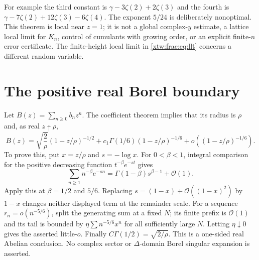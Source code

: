 \documentclass[11pt]{article}
\theoremstyle{remark}\newtheorem{remark}[theorem]{Remark}
\newcommand{\OO}{\mathcal O}
\begin{document}
For example the third constant is $\gamma-3\zeta(2)+2\zeta(3)$ and
the fourth is $\gamma-7\zeta(2)+12\zeta(3)-6\zeta(4)$.
The exponent $5/24$ is deliberately nonoptimal. This theorem is local near
$z=1$; it is not a global complex-$y$ estimate, a lattice local limit for
$K_n$, control of cumulants with growing order, or an explicit finite-$n$
error certificate. The finite-height local limit in \eqref{xtw:frac:eq:llt}
concerns a different random variable.

\section{The positive real Borel boundary}\label{xtw:frac:sec:borel}
Let $B(z)=\sum_{n\ge0}b_nz^n$. The coefficient theorem implies that its
radius is $\rho$ and, as real $z\uparrow\rho$,
\begin{equation}\label{xtw:frac:eq:borel}
 B(z)=\sqrt{\frac2\rho}(1-z/\rho)^{-1/2}
   +c_1\Gamma(1/6)(1-z/\rho)^{-1/6}
   +o((1-z/\rho)^{-1/6}).
\end{equation}
To prove this, put $x=z/\rho$ and $s=-\log x$. For $0<\beta<1$,
integral comparison for the positive decreasing function
$t^{-\beta}e^{-st}$ gives
\[
 \sum_{n\ge1}n^{-\beta}e^{-sn}
                 =\Gamma(1-\beta)s^{\beta-1}+\OO(1).
\]
Apply this at $\beta=1/2$ and $5/6$. Replacing
$s=(1-x)+\OO((1-x)^2)$ by $1-x$ changes neither displayed term at the
remainder scale. For a sequence $r_n=o(n^{-5/6})$, split the generating
sum at a fixed $N$; its finite prefix is $\OO(1)$ and its tail is bounded
by $\eta\sum n^{-5/6}x^n$ for all sufficiently large $N$. Letting
$\eta\downarrow0$ gives the asserted little-$o$. Finally
$C\Gamma(1/2)=\sqrt{2/\rho}$.
This is a one-sided real Abelian conclusion. No complex sector or
$\Delta$-domain Borel singular expansion is asserted.
\end{document}
